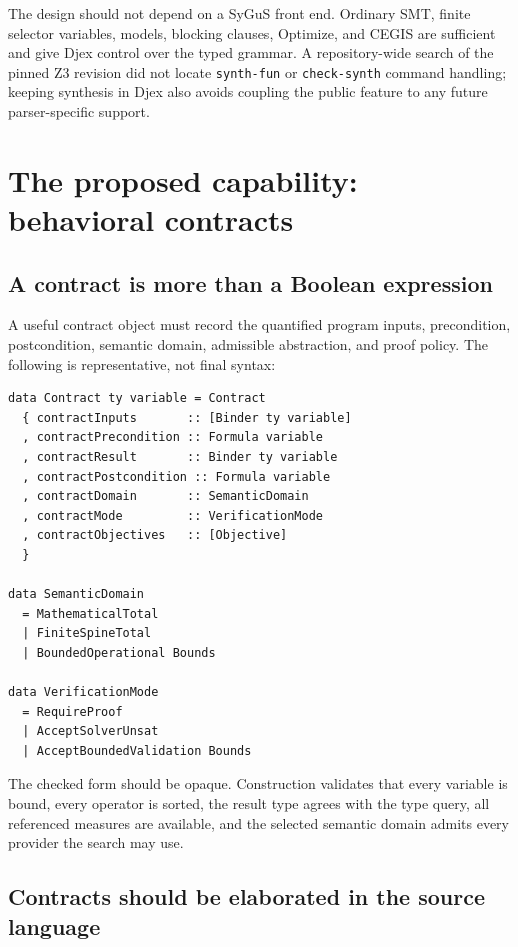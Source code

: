 \documentclass[11pt,oneside]{article}
\newcommand{\code}[1]{\texttt{#1}}
\begin{document}
The design should not depend on a SyGuS front end. Ordinary SMT, finite selector
variables, models, blocking clauses, Optimize, and CEGIS are sufficient and give Djex
control over the typed grammar. A repository-wide search of the pinned Z3 revision did
not locate \code{synth-fun} or \code{check-synth} command handling; keeping synthesis
in Djex also avoids coupling the public feature to any future parser-specific support.

\section{The proposed capability: behavioral contracts}

\subsection{A contract is more than a Boolean expression}

A useful contract object must record the quantified program inputs, precondition,
postcondition, semantic domain, admissible abstraction, and proof policy. The following
is representative, not final syntax:

\begin{lstlisting}[language=HaskellExt,caption={Backend-neutral contract vocabulary}]
data Contract ty variable = Contract
  { contractInputs       :: [Binder ty variable]
  , contractPrecondition :: Formula variable
  , contractResult       :: Binder ty variable
  , contractPostcondition :: Formula variable
  , contractDomain       :: SemanticDomain
  , contractMode         :: VerificationMode
  , contractObjectives   :: [Objective]
  }

data SemanticDomain
  = MathematicalTotal
  | FiniteSpineTotal
  | BoundedOperational Bounds

data VerificationMode
  = RequireProof
  | AcceptSolverUnsat
  | AcceptBoundedValidation Bounds
\end{lstlisting}

The checked form should be opaque. Construction validates that every variable is
bound, every operator is sorted, the result type agrees with the type query, all
referenced measures are available, and the selected semantic domain admits every
provider the search may use.

\subsection{Contracts should be elaborated in the source language}
\end{document}
